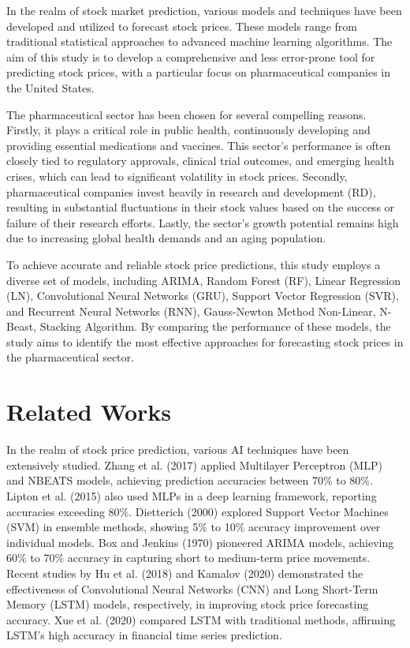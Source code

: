 \documentclass{ieeeojies}
\begin{document}
In the realm of stock market prediction, various models and techniques have been developed and utilized to forecast stock prices. These models range from traditional statistical approaches to advanced machine learning algorithms. The aim of this study is to develop a comprehensive and less error-prone tool for predicting stock prices, with a particular focus on pharmaceutical companies in the United States.

The pharmaceutical sector has been chosen for several compelling reasons. Firstly, it plays a critical role in public health, continuously developing and providing essential medications and vaccines. This sector's performance is often closely tied to regulatory approvals, clinical trial outcomes, and emerging health crises, which can lead to significant volatility in stock prices. Secondly, pharmaceutical companies invest heavily in research and development (RD), resulting in substantial fluctuations in their stock values based on the success or failure of their research efforts. Lastly, the sector's growth potential remains high due to increasing global health demands and an aging population.

To achieve accurate and reliable stock price predictions, this study employs a diverse set of models, including ARIMA, Random Forest (RF), Linear Regression (LN), Convolutional Neural Networks (GRU), Support Vector Regression (SVR), and Recurrent Neural Networks (RNN), Gauss-Newton Method Non-Linear, N-Beast, Stacking Algorithm. By comparing the performance of these models, the study aims to identify the most effective approaches for forecasting stock prices in the pharmaceutical sector.


\section{Related Works}
In the realm of stock price prediction, various AI techniques have been extensively studied. Zhang et al. (2017) applied Multilayer Perceptron (MLP) and NBEATS models, achieving prediction accuracies between 70\% to 80\%. Lipton et al. (2015) also used MLPs in a deep learning framework, reporting accuracies exceeding 80\%. Dietterich (2000) explored Support Vector Machines (SVM) in ensemble methods, showing 5\% to 10\% accuracy improvement over individual models. Box and Jenkins (1970) pioneered ARIMA models, achieving 60\% to 70\% accuracy in capturing short to medium-term price movements. Recent studies by Hu et al. (2018) and Kamalov (2020) demonstrated the effectiveness of Convolutional Neural Networks (CNN) and Long Short-Term Memory (LSTM) models, respectively, in improving stock price forecasting accuracy. Xue et al. (2020) compared LSTM with traditional methods, affirming LSTM's high accuracy in financial time series prediction.
\end{document}
